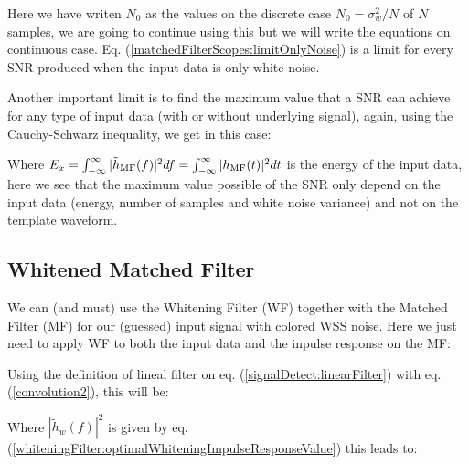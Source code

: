 \newp Here we have writen $N_0$ as the values on the discrete case $N_0 = \sigma_w^{2} / N$ of $N$ samples, we are going to continue using this but we will write the equations on continuous case. Eq. (\ref{matchedFilterScopes:limitOnlyNoise}) is a limit for every SNR produced when the input data is only white noise.

\newp Another important limit is to find the maximum value that a SNR can achieve for any type of input data (with or without underlying signal), again, using the Cauchy-Schwarz inequality, we get in this case:


\newp Where $E_x = \int_{-\infty}^{\infty} |\tilde{h}_{\text{MF}}(f)|^{2} df = \int_{-\infty}^{\infty} |h_{\text{MF}}(t)|^{2} dt$ is the energy of the input data, here we see that the maximum value possible of the SNR only depend on the input data (energy, number of samples and white noise variance) and not on the template waveform.

\subsection{Whitened Matched Filter}{\label{sec:signalDetect::ssec:WMF}}

\newp We can (and must) use the Whitening Filter (WF) together with the Matched Filter (MF) for our (guessed) input signal with colored WSS noise. Here we just need to apply WF to both the input data and the inpulse response on the MF:

\newp Using the definition of lineal filter on eq. (\ref{signalDetect:linearFilter}) with eq. (\ref{convolution2}), this will be:


\newp Where $|\tilde{h}_w(f)|^{2}$ is given by eq. (\ref{whiteningFilter:optimalWhiteningImpulseResponseValue}) this leads to:

